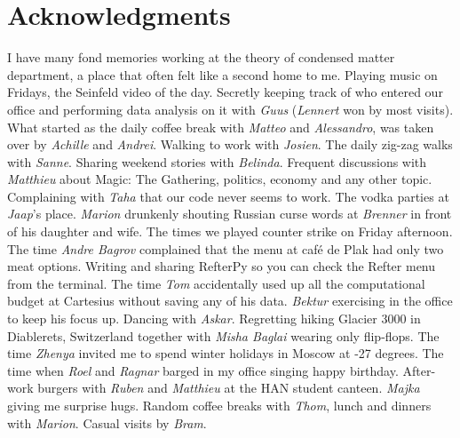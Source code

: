 \manualmark
{}%
%
%
\chapter*{Acknowledgments}%


I have many fond memories working at the theory of condensed matter department, a place that often felt like a second home to me. Playing music on Fridays, the Seinfeld video of the day. Secretly keeping track of who entered our office and performing data analysis on it with \emph{Guus} (\emph{Lennert} won by most visits). What started as the daily coffee break with \emph{Matteo} and \emph{Alessandro}, was taken over by \emph{Achille} and \emph{Andrei}. Walking to work with \emph{Josien}. The daily zig-zag walks with \emph{Sanne}. Sharing weekend stories with \emph{Belinda}. Frequent discussions with \emph{Matthieu} about Magic: The Gathering, politics, economy and any other topic. Complaining with \emph{Taha} that our code never seems to work.
The vodka parties at \emph{Jaap}'s place. \emph{Marion} drunkenly shouting Russian curse words at \emph{Brenner} in front of his daughter and wife. The times we played counter strike on Friday afternoon. The time \emph{Andre Bagrov} complained that the menu at caf\'e de Plak had only two meat options. 
Writing and sharing RefterPy so you can check the Refter menu from the terminal. The time \emph{Tom} accidentally used up all the computational budget at Cartesius without saving any of his data. \emph{Bektur} exercising in the office to keep his focus up. Dancing with \emph{Askar}. Regretting hiking Glacier 3000 in Diablerets, Switzerland together with \emph{Misha Baglai} wearing only flip-flops. The time \emph{Zhenya} invited me to spend winter holidays in Moscow at -27 degrees. The time when \emph{Roel} and \emph{Ragnar} barged in my office singing happy birthday. After-work burgers with \emph{Ruben} and \emph{Matthieu} at the HAN student canteen. \emph{Majka} giving me surprise hugs. Random coffee breaks with \emph{Thom}, lunch and dinners with \emph{Marion}. Casual visits by \emph{Bram}. %
